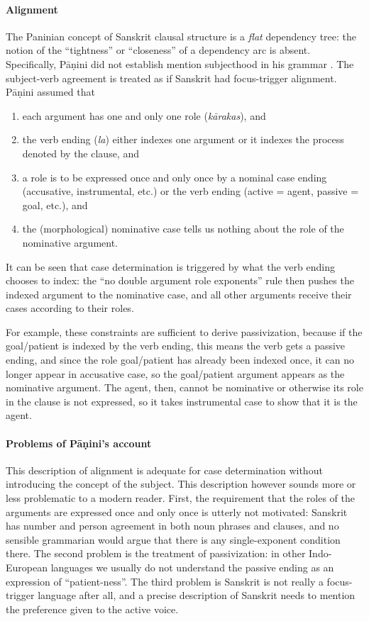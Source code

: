 \documentclass[a4paper, oneside, 12pt]{report}
\newcommand{\form}[1]{\emph{#1}}
\begin{document}
\paragraph*{Alignment}
The Paninian concept of Sanskrit clausal structure is a \emph{flat} dependency tree:
the notion of the ``tightness'' or ``closeness'' of a dependency arc is absent.
Specifically, Pāṇini did not establish mention subjecthood in his grammar \citep{kiparsky2009architecture}.
The subject-verb agreement is treated as if Sanskrit had focus-trigger alignment.
Pāṇini assumed that 
\begin{enumerate}
    \item each argument has one and only one role (\form{kārakas}), and
    \item the verb ending (\form{la}) either indexes one argument or it indexes the process denoted by the clause, and
    \item a role is to be expressed once and only once by a nominal case ending (accusative, instrumental, etc.) 
    or the verb ending (active = agent, passive = goal, etc.), and
    \item the (morphological) nominative case tells us nothing about the role of the nominative argument.
\end{enumerate}
It can be seen that case determination is triggered by what the verb ending chooses to index:
the ``no double argument role exponents'' rule then pushes the indexed argument to the nominative case,
and all other arguments receive their cases according to their roles.

For example, these constraints are sufficient to derive passivization,
because if the goal/patient is indexed by the verb ending,
this means the verb gets a passive ending,
and since the role goal/patient has already been indexed once,
it can no longer appear in accusative case,
so the goal/patient argument appears as the nominative argument.
The agent, then, cannot be nominative or otherwise its role in the clause is not expressed,
so it takes instrumental case to show that it is the agent.

\paragraph*{Problems of Pāṇini's account}
This description of alignment is adequate for case determination without introducing the concept of the subject.
This description however sounds more or less problematic to a modern reader.
First, the requirement that the roles of the arguments are expressed once and only once is utterly not motivated:
Sanskrit has number and person agreement in both noun phrases and clauses,
and no sensible grammarian would argue that there is any single-exponent condition there.
The second problem is the treatment of passivization: 
in other Indo-European languages we usually do not understand the passive ending
as an expression of ``patient-ness''.
The third problem is Sanskrit is not really a focus-trigger language after all,
and a precise description of Sanskrit needs to mention the preference given to the active voice.
\end{document}
